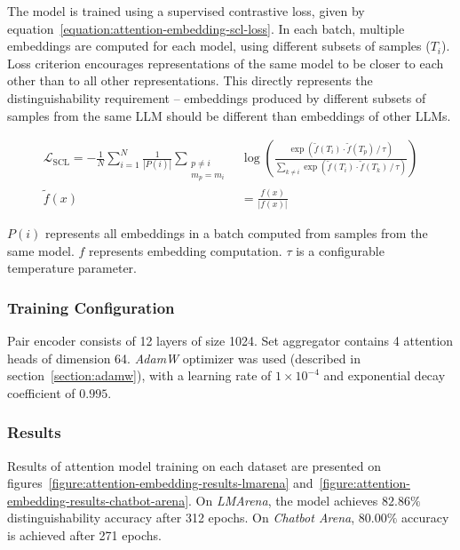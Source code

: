 \documentclass[a4paper,11pt,twoside]{report}
\theoremstyle{definition}
\begin{document}
The model is trained using a supervised contrastive loss, given by equation~\ref{equation:attention-embedding-scl-loss}. In each batch, multiple embeddings are computed for each model, using different subsets of samples ($T_i$). Loss criterion encourages representations of the same model to be closer to each other than to all other representations. This directly represents the distinguishability requirement -- embeddings produced by different subsets of samples from the same LLM should be different than embeddings of other LLMs.

\begin{align}
\label{equation:attention-embedding-scl-loss}
    \mathcal{L}_{\mathrm{SCL}} = - \frac{1}{N} \sum_{i=1}^{N} \frac{1}{|P(i)|} \sum_{\substack{p \neq i \\ m_p = m_i}} & \log \left(
    \frac{
        \exp\!\left(\tilde{f}(T_i) \cdot \tilde{f}(T_p) \,/\, \tau\right)
    }{
        \displaystyle\sum_{k \neq i} \exp\!\left(\tilde{f}(T_i) \cdot \tilde{f}(T_k) \,/\, \tau\right)
    } \right) \\
    \tilde{f}(x) &= \frac{f(x)}{\vert f(x) \vert}
\end{align}

$P(i)$ represents all embeddings in a batch computed from samples from the same model. $f$ represents embedding computation. $\tau$ is a configurable temperature parameter.

\subsubsection{Training Configuration}

Pair encoder consists of 12 layers of size 1024. Set aggregator contains 4 attention heads of dimension 64. \textit{AdamW} optimizer was used (described in section~\ref{section:adamw}), with a learning rate of $1 \times 10^{-4}$ and exponential decay coefficient of $0.995$.

\subsubsection{Results}

Results of attention model training on each dataset are presented on figures~\ref{figure:attention-embedding-results-lmarena} and~\ref{figure:attention-embedding-results-chatbot-arena}. On \textit{LMArena}, the model achieves $82.86 \%$ distinguishability accuracy after 312 epochs. On \textit{Chatbot Arena}, $80.00 \%$ accuracy is achieved after 271 epochs.
\end{document}
